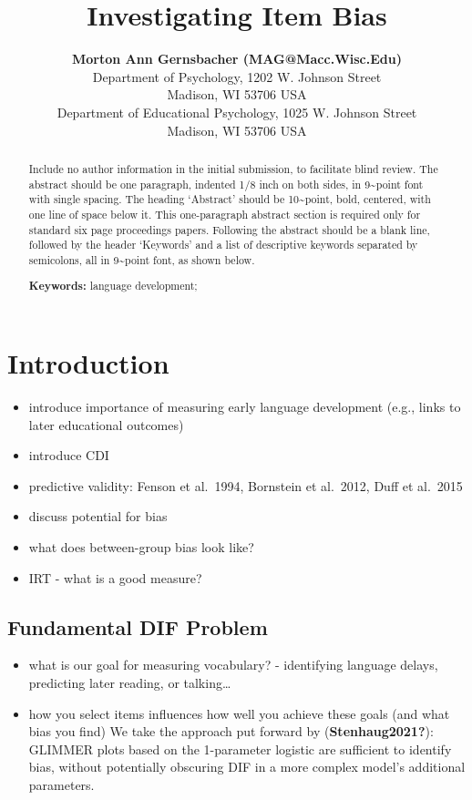 \documentclass[10pt, letterpaper]{article}
\title{Investigating Item Bias}
\author{{\large \bf Morton Ann Gernsbacher (MAG@Macc.Wisc.Edu)} \\ Department of Psychology, 1202 W. Johnson Street \\ Madison, WI 53706 USA \AND {\large \bf Sharon J.~Derry (SDJ@Macc.Wisc.Edu)} \\ Department of Educational Psychology, 1025 W. Johnson Street \\ Madison, WI 53706 USA}
\begin{document}
\maketitle

\begin{abstract}
Include no author information in the initial submission, to facilitate
blind review. The abstract should be one paragraph, indented 1/8 inch on
both sides, in 9\textasciitilde point font with single spacing. The
heading `Abstract' should be 10\textasciitilde point, bold, centered,
with one line of space below it. This one-paragraph abstract section is
required only for standard six page proceedings papers. Following the
abstract should be a blank line, followed by the header `Keywords' and a
list of descriptive keywords separated by semicolons, all in
9\textasciitilde point font, as shown below.

\textbf{Keywords:}
language development;
\end{abstract}

\hypertarget{introduction}{%
\section{Introduction}\label{introduction}}

\begin{itemize}
\item
  introduce importance of measuring early language development (e.g.,
  links to later educational outcomes)
\item
  introduce CDI
\item
  predictive validity: Fenson et al.~1994, Bornstein et al.~2012, Duff
  et al.~2015
\item
  discuss potential for bias
\item
  what does between-group bias look like?
\item
  IRT - what is a good measure?
\end{itemize}

\hypertarget{fundamental-dif-problem}{%
\subsection{Fundamental DIF Problem}\label{fundamental-dif-problem}}

\begin{itemize}
\tightlist
\item
  what is our goal for measuring vocabulary? - identifying language
  delays, predicting later reading, or talking\ldots{}
\item
  how you select items influences how well you achieve these goals (and
  what bias you find) We take the approach put forward by
  (\textbf{Stenhaug2021?}): GLIMMER plots based on the 1-parameter
  logistic are sufficient to identify bias, without potentially
  obscuring DIF in a more complex model's additional parameters.
\end{itemize}
\end{document}
